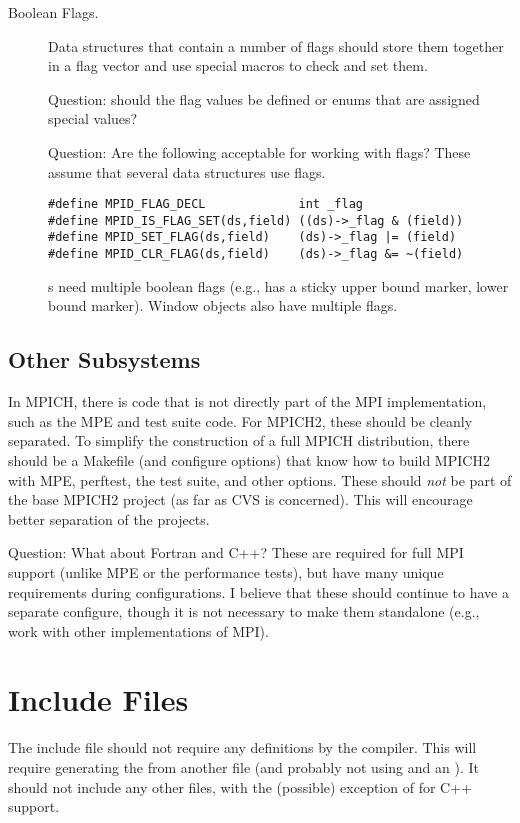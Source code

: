 \documentclass{article}
\begin{document}
\begin{description}
\item[Boolean Flags.]
Data structures that contain a number of flags should store them
together in a flag vector and use special macros to check and set
them.  

Question: should the flag values be defined or enums that are assigned
special values?

Question: Are the following acceptable for working with flags?  These
assume that several data structures use flags.
\begin{verbatim}
#define MPID_FLAG_DECL             int _flag
#define MPID_IS_FLAG_SET(ds,field) ((ds)->_flag & (field))
#define MPID_SET_FLAG(ds,field)    (ds)->_flag |= (field)
#define MPID_CLR_FLAG(ds,field)    (ds)->_flag &= ~(field)
\end{verbatim}
s need multiple boolean flags (e.g., has a
sticky upper bound marker, lower bound marker).  Window objects also
have multiple flags.

\end{description}

\subsection{Other Subsystems}
In MPICH, there is code that is not directly part of the MPI
implementation, such as the MPE and test suite code.  For MPICH2,
these should be cleanly separated.  To simplify the construction of a
full MPICH distribution, there should be a Makefile (and configure
options) that know how to build MPICH2 with MPE, perftest, the test
suite, and other options.  These should \emph{not} be part of the base
MPICH2 project (as far as CVS is concerned).  This will encourage
better separation of the projects.

Question: What about Fortran and C++?  These are required for full MPI support
(unlike MPE or the performance tests), but have many unique requirements
during configurations.  I believe that these should continue to have a
separate configure, though it is not necessary to make them standalone (e.g.,
work with other implementations of MPI).

\section{Include Files}
The include file  should not require any 
definitions by the compiler.  This will require generating the
 from another file (and probably not using  and an
).  It should not include any other
files, with the (possible) exception of  for C++
support.
\end{document}
